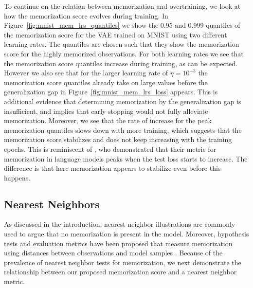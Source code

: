 \documentclass{article}
\begin{document}
To continue on the relation between memorization and overtraining, we look at 
how the memorization score evolves during training. In 
Figure~\ref{fig:mnist_mem_lrs_quantiles} we show the 0.95 and 0.999 quantiles 
of the memorization score for the VAE trained on MNIST using two different 
learning rates. The quantiles are chosen such that they show the memorization 
score for the highly memorized observations. For both learning rates we see 
that the memorization score quantiles increase during training, as can be 
expected.  However we also see that for the larger learning rate of $\eta = 
10^{-3}$ the memorization score quantiles already take on large values before 
the generalization gap in Figure~\ref{fig:mnist_mem_lrs_loss} appears.  This 
is additional evidence that determining memorization by the generalization gap 
is insufficient, and implies that early stopping would not fully alleviate 
memorization. Moreover, we see that the rate of increase for the peak 
memorization quantiles slows down with more training, which suggests that the 
memorization score stabilizes and does not keep increasing with the training 
epochs. This is reminiscent of \cite{carlini2019secret}, who demonstrated that 
their metric for memorization in language models peaks when the test loss 
starts to increase. The difference is that here memorization appears to 
stabilize even before this happens.


\subsection{Nearest Neighbors}
\label{sub:nearest_neighbors}


As discussed in the introduction, nearest neighbor illustrations are commonly 
used to argue that no memorization is present in the model. Moreover, 
hypothesis tests and evaluation metrics have been proposed that measure 
memorization using distances between observations and model samples
\cite{xu2018empirical,meehan2020non}. Because of the prevalence of nearest 
neighbor tests for memorization, we next demonstrate the relationship between 
our proposed memorization score and a nearest neighbor metric.
\end{document}

